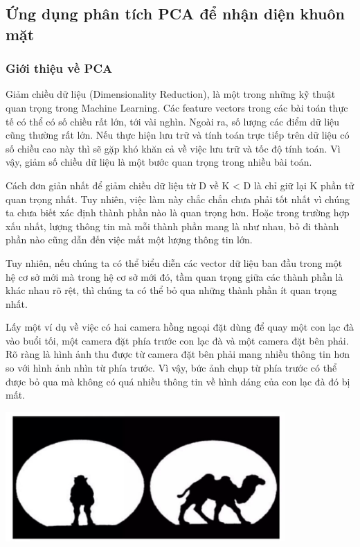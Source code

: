 \documentclass[12pt,a4paper]{article}
\begin{document}
\subsection{Ứng dụng phân tích PCA để nhận diện khuôn mặt}
\subsubsection{Giới thiệu về PCA}

Giảm chiều dữ liệu (Dimensionality Reduction), là một trong những kỹ thuật quan trọng trong Machine Learning. Các feature vectors trong các bài toán thực tế có thể có số chiều rất lớn, tới vài nghìn. Ngoài ra, số lượng các điểm dữ liệu cũng thường rất lớn. Nếu thực hiện lưu trữ và tính toán trực tiếp trên dữ liệu có số chiều cao này thì sẽ gặp khó khăn cả về việc lưu trữ và tốc độ tính toán. Vì vậy, giảm số chiều dữ liệu là một bước quan trọng trong nhiều bài toán.

Cách đơn giản nhất để giảm chiều dữ liệu từ D về K < D là chỉ giữ lại K phần tử quan trọng nhất. Tuy nhiên, việc làm này chắc chắn chưa phải tốt nhất vì chúng ta chưa biết xác định thành phần nào là quan trọng hơn. Hoặc trong trường hợp xấu nhất, lượng thông tin mà mỗi thành phần mang là như nhau, bỏ đi thành phần nào cũng dẫn đến việc mất một lượng thông tin lớn.

Tuy nhiên, nếu chúng ta có thể biểu diễn các vector dữ liệu ban đầu trong một hệ cơ sở mới mà trong hệ cơ sở mới đó, tầm quan trọng giữa các thành phần là khác nhau rõ rệt, thì chúng ta có thể bỏ qua những thành phần ít quan trọng nhất.

Lấy một ví dụ về việc có hai camera hồng ngoại đặt dùng để quay một con lạc đà vào buổi tối, một camera đặt phía trước con lạc đà và một camera đặt bên phải. Rõ ràng là hình ảnh thu được từ camera đặt bên phải mang nhiều thông tin hơn so với hình ảnh nhìn từ phía trước. Vì vậy, bức ảnh chụp từ phía trước có thể được bỏ qua mà không có quá nhiều thông tin về hình dáng của con lạc đà đó bị mất.
\begin{center}
    \includegraphics[width = 0.8\textwidth]{1.png}
\end{center}
\end{document}
